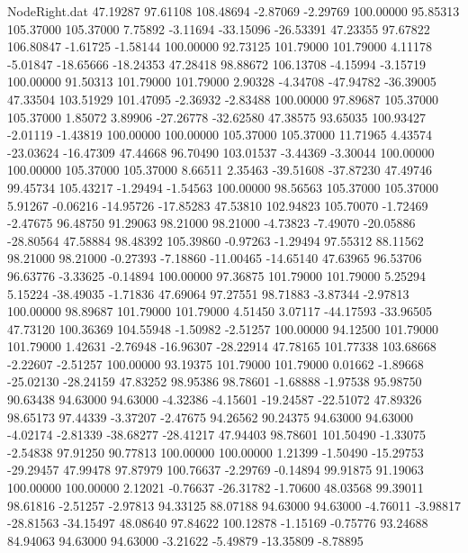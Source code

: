 \begin{filecontents}{NodeRight.dat}
  47.19287   97.61108  108.48694    -2.87069   -2.29769  100.00000   95.85313  105.37000  105.37000    7.75892   -3.11694  -33.15096  -26.53391
  47.23355   97.67822  106.80847    -1.61725   -1.58144  100.00000   92.73125  101.79000  101.79000    4.11178   -5.01847  -18.65666  -18.24353
  47.28418   98.88672  106.13708    -4.15994   -3.15719  100.00000   91.50313  101.79000  101.79000    2.90328   -4.34708  -47.94782  -36.39005
  47.33504  103.51929  101.47095    -2.36932   -2.83488  100.00000   97.89687  105.37000  105.37000    1.85072    3.89906  -27.26778  -32.62580
  47.38575   93.65035  100.93427    -2.01119   -1.43819  100.00000  100.00000  105.37000  105.37000   11.71965    4.43574  -23.03624  -16.47309
  47.44668   96.70490  103.01537    -3.44369   -3.30044  100.00000  100.00000  105.37000  105.37000    8.66511    2.35463  -39.51608  -37.87230
  47.49746   99.45734  105.43217    -1.29494   -1.54563  100.00000   98.56563  105.37000  105.37000    5.91267   -0.06216  -14.95726  -17.85283
  47.53810  102.94823  105.70070    -1.72469   -2.47675   96.48750   91.29063   98.21000   98.21000   -4.73823   -7.49070  -20.05886  -28.80564
  47.58884   98.48392  105.39860    -0.97263   -1.29494   97.55312   88.11562   98.21000   98.21000   -0.27393   -7.18860  -11.00465  -14.65140
  47.63965   96.53706   96.63776    -3.33625   -0.14894  100.00000   97.36875  101.79000  101.79000    5.25294    5.15224  -38.49035   -1.71836
  47.69064   97.27551   98.71883    -3.87344   -2.97813  100.00000   98.89687  101.79000  101.79000    4.51450    3.07117  -44.17593  -33.96505
  47.73120  100.36369  104.55948    -1.50982   -2.51257  100.00000   94.12500  101.79000  101.79000    1.42631   -2.76948  -16.96307  -28.22914
  47.78165  101.77338  103.68668    -2.22607   -2.51257  100.00000   93.19375  101.79000  101.79000    0.01662   -1.89668  -25.02130  -28.24159
  47.83252   98.95386   98.78601    -1.68888   -1.97538   95.98750   90.63438   94.63000   94.63000   -4.32386   -4.15601  -19.24587  -22.51072
  47.89326   98.65173   97.44339    -3.37207   -2.47675   94.26562   90.24375   94.63000   94.63000   -4.02174   -2.81339  -38.68277  -28.41217
  47.94403   98.78601  101.50490    -1.33075   -2.54838   97.91250   90.77813  100.00000  100.00000    1.21399   -1.50490  -15.29753  -29.29457
  47.99478   97.87979  100.76637    -2.29769   -0.14894   99.91875   91.19063  100.00000  100.00000    2.12021   -0.76637  -26.31782   -1.70600
  48.03568   99.39011   98.61816    -2.51257   -2.97813   94.33125   88.07188   94.63000   94.63000   -4.76011   -3.98817  -28.81563  -34.15497
  48.08640   97.84622  100.12878    -1.15169   -0.75776   93.24688   84.94063   94.63000   94.63000   -3.21622   -5.49879  -13.35809   -8.78895

\end{filecontents}
